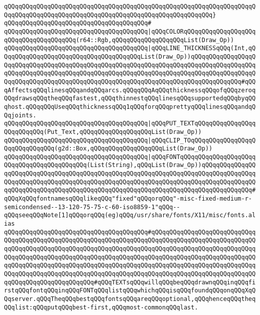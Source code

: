 \verb|qQQqqQQqqQQqqQQqqQQqqQQqqQQqqQQqqQQqqQQqqQQqqQQqqQQqqQQqqQQqqQQqqQQqqQQqqQQqqQQqqQQqqQQqqQQqqQQqqQQqqQQqqQQqqQQqqQQqqQQqqQQqqQQq}|\newline
\verb|qQQqqQQqqQQqqQQqqQQqqQQqqQQqqQQqqQQqqQQq#|\newline
\verb|qQQqqQQqqQQqqQQqqQQqqQQqqQQqqQQqqQQqqQQq|\verb#|qQQqCOLORqQQqqQQqqQQqqQQqqQQqqQQqqQQqqQQqqQQqqQQq(r64::Rgb,qQQqqQQqqQQqqQQqqQQqList(Draw_Op))#\newline
\verb|qQQqqQQqqQQqqQQqqQQqqQQqqQQqqQQqqQQqqQQq|\verb#|qQQqLINE_THICKNESSqQQq(Int,qQQqqQQqqQQqqQQqqQQqqQQqqQQqqQQqqQQqqQQqList(Draw_Op))qQQqqQQqqQQqqQQqqQQqqQQqqQQqqQQqqQQqqQQqqQQqqQQqqQQqqQQqqQQqqQQqqQQqqQQqqQQqqQQqqQQqqQQqqQQqqQQqqQQqqQQqqQQqqQQqqQQqqQQqqQQqqQQqqQQqqQQqqQQqqQQqqQQqqQQqqQQqqQQqqQQqqQQqqQQqqQQqqQQqqQQqqQQqqQQqqQQqqQQqqQQqqQQqqQQqqQQqqQQqqQQq#\verb|#qQQqAffectsqQQqlinesqQQqandqQQqarcs.qQQqqQQqAqQQqthicknessqQQqofqQQqzeroqQQqdrawsqQQqtheqQQqfastest,qQQqthinnestqQQqlinesqQQqsupportedqQQqbyqQQqhost.qQQqqQQqUseqQQqthicknessqQQq1qQQqforqQQqprettyqQQqlinesqQQqandqQQqjoints.|\newline
\verb|qQQqqQQqqQQqqQQqqQQqqQQqqQQqqQQqqQQqqQQq|\verb#|qQQqPUT_TEXTqQQqqQQqqQQqqQQqqQQqqQQqqQQq(Put_Text,qQQqqQQqqQQqqQQqqQQqList(Draw_Op))#\newline
\verb|qQQqqQQqqQQqqQQqqQQqqQQqqQQqqQQqqQQqqQQq|\verb#|qQQqCLIP_TOqQQqqQQqqQQqqQQqqQQqqQQqqQQqqQQq(g2d::Box,qQQqqQQqqQQqqQQqqQQqList(Draw_Op))#\newline
\verb|qQQqqQQqqQQqqQQqqQQqqQQqqQQqqQQqqQQqqQQq|\verb#|qQQqFONTqQQqqQQqqQQqqQQqqQQqqQQqqQQqqQQqqQQqqQQqqQQq(List(String),qQQqList(Draw_Op))qQQqqQQqqQQqqQQqqQQqqQQqqQQqqQQqqQQqqQQqqQQqqQQqqQQqqQQqqQQqqQQqqQQqqQQqqQQqqQQqqQQqqQQqqQQqqQQqqQQqqQQqqQQqqQQqqQQqqQQqqQQqqQQqqQQqqQQqqQQqqQQqqQQqqQQqqQQqqQQqqQQqqQQqqQQqqQQqqQQqqQQqqQQqqQQqqQQqqQQqqQQqqQQqqQQqqQQqqQQqqQQq#\verb|#qQQqXqQQqfontnamesqQQqlikeqQQq"fixed"qQQqorqQQq"-misc-fixed-medium-r-semicondensed--13-120-75-75-c-60-iso8859-1"qQQq--qQQqseeqQQqNote[1]qQQqorqQQq(eg)qQQq/usr/share/fonts/X11/misc/fonts.alias|\newline
\verb|qQQqqQQqqQQqqQQqqQQqqQQqqQQqqQQqqQQqqQQq#qQQqqQQqqQQqqQQqqQQqqQQqqQQqqQQqqQQqqQQqqQQqqQQqqQQqqQQqqQQqqQQqqQQqqQQqqQQqqQQqqQQqqQQqqQQqqQQqqQQqqQQqqQQqqQQqqQQqqQQqqQQqqQQqqQQqqQQqqQQqqQQqqQQqqQQqqQQqqQQqqQQqqQQqqQQqqQQqqQQqqQQqqQQqqQQqqQQqqQQqqQQqqQQqqQQqqQQqqQQqqQQqqQQqqQQqqQQqqQQqqQQqqQQqqQQqqQQqqQQqqQQqqQQqqQQqqQQqqQQqqQQqqQQqqQQqqQQqqQQqqQQqqQQqqQQqqQQqqQQqqQQqqQQqqQQqqQQqqQQqqQQqqQQqqQQqqQQqqQQqqQQqqQQqqQQqqQQqqQQqqQQqqQQqqQQqqQQqqQQqqQQq#qQQqTEXTsqQQqwillqQQqbeqQQqdrawnqQQqinqQQqfirstqQQqfontqQQqinqQQqFONTqQQqlistqQQqwhichqQQqisqQQqfoundqQQqonqQQqXqQQqserver.qQQqTheqQQqbestqQQqfontsqQQqareqQQqoptional,qQQqhenceqQQqtheqQQqlist:qQQqputqQQqbest-first,qQQqmost-commonqQQqlast.|\newline

